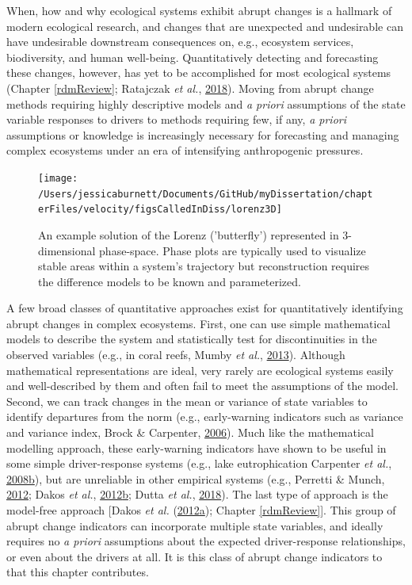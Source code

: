 \documentclass[12pt,twoside,openany]{reedthesis}
\begin{document}
When, how and why ecological systems exhibit abrupt changes is a hallmark of modern ecological research, and changes that are unexpected and undesirable can have undesirable downstream consequences on, e.g., ecosystem services, biodiversity, and human well-being. Quantitatively detecting and forecasting these changes, however, has yet to be accomplished for most ecological systems (Chapter \ref{rdmReview}; Ratajczak \emph{et al.}, \protect\hyperlink{ref-ratajczak2018abrupt}{2018}). Moving from abrupt change methods requiring highly descriptive models and \emph{a priori} assumptions of the state variable responses to drivers to methods requiring few, if any, \emph{a priori} assumptions or knowledge is increasingly necessary for forecasting and managing complex ecosystems under an era of intensifying anthropogenic pressures.
\begin{figure}
\texttt{[image: /Users/jessicaburnett/Documents/GitHub/myDissertation/chapterFiles/velocity/figsCalledInDiss/lorenz3D]} \caption{An example solution of the Lorenz ('butterfly') represented in 3-dimensional phase-space. Phase plots are typically used to visualize stable areas within a system's trajectory but reconstruction requires the difference models to be known and parameterized.}\label{fig:lorenz3D}
\end{figure}
A few broad classes of quantitative approaches exist for quantitatively identifying abrupt changes in complex ecosystems. First, one can use simple mathematical models to describe the system and statistically test for discontinuities in the observed variables (e.g., in coral reefs, Mumby \emph{et al.}, \protect\hyperlink{ref-mumby2013evidence}{2013}). Although mathematical representations are ideal, very rarely are ecological systems easily and well-described by them and often fail to meet the assumptions of the model. Second, we can track changes in the mean or variance of state variables to identify departures from the norm (e.g., early-warning indicators such as variance and variance index, Brock \& Carpenter, \protect\hyperlink{ref-brock_variance_2006}{2006}). Much like the mathematical modelling approach, these early-warning indicators have shown to be useful in some simple driver-response systems (e.g., lake eutrophication Carpenter \emph{et al.}, \protect\hyperlink{ref-carpenter_leading_2008}{2008}\protect\hyperlink{ref-carpenter_leading_2008}{b}), but are unreliable in other empirical systems (e.g., Perretti \& Munch, \protect\hyperlink{ref-perretti2012regime}{2012}; Dakos \emph{et al.}, \protect\hyperlink{ref-dakos2012robustness}{2012}\protect\hyperlink{ref-dakos2012robustness}{b}; Dutta \emph{et al.}, \protect\hyperlink{ref-dutta2018robustness}{2018}). The last type of approach is the model-free approach {[}Dakos \emph{et al.} (\protect\hyperlink{ref-dakos2012methods}{2012}\protect\hyperlink{ref-dakos2012methods}{a}); Chapter \ref{rdmReview}{]}. This group of abrupt change indicators can incorporate multiple state variables, and ideally requires no \emph{a priori} assumptions about the expected driver-response relationships, or even about the drivers at all. It is this class of abrupt change indicators to that this chapter contributes.
\end{document}
